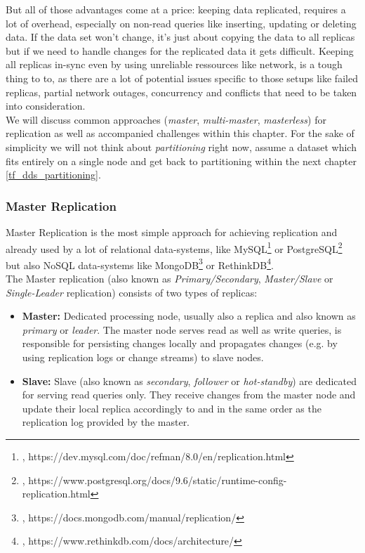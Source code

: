 {But all of those advantages come at a price: keeping data replicated, requires a lot of overhead, especially on non-read queries like inserting, updating or deleting data. If the data set won't change, it's just about copying the data to all replicas but if we need to handle changes for the replicated data it gets difficult. Keeping all replicas in-sync even by using unreliable ressources like network, is a tough thing to to, as there are a lot of potential issues specific to those setups like failed replicas, partial network outages, concurrency and conflicts that need to be taken into consideration.  \\
We will discuss common approaches (\textit{master}, \textit{multi-master}, \textit{masterless}) for replication as well as accompanied challenges within this chapter. For the sake of simplicity we will not think about \textit{partitioning} right now, assume a dataset which fits entirely on a single node and get back to partitioning within the next chapter \ref{tf_dds_partitioning}.

\subsubsection{Master Replication}
\label{tf_dds_replication_master}
Master Replication is the most simple approach for achieving replication and already used by a lot of relational data-systems, like MySQL\footnote{\cite{MYSQLREP}, https://dev.mysql.com/doc/refman/8.0/en/replication.html} or PostgreSQL\footnote{\cite{PSQLREP}, https://www.postgresql.org/docs/9.6/static/runtime-config-replication.html} but also NoSQL data-systems like MongoDB\footnote{\cite{MDBREP}, https://docs.mongodb.com/manual/replication/} or RethinkDB\footnote{\cite{RDBREP}, https://www.rethinkdb.com/docs/architecture/}.\\
The Master replication (also known as \textit{Primary/Secondary}, \textit{Master/Slave} or \textit{Single-Leader} replication) consists of two types of replicas:\\
\begin{itemize}
\item \textbf{Master:} Dedicated processing node, usually also a replica and also known as \textit{primary} or \textit{leader}. The master node serves read as well as write queries, is responsible for persisting changes locally and propagates changes (e.g. by using replication logs or change streams) to slave nodes.
\item \textbf{Slave:} Slave (also known as \textit{secondary}, \textit{follower} or \textit{hot-standby}) are dedicated for serving read queries only. They receive changes from the master node and update their local replica accordingly to and in the same order as the replication log provided by the master.\\
\end{itemize}

}
